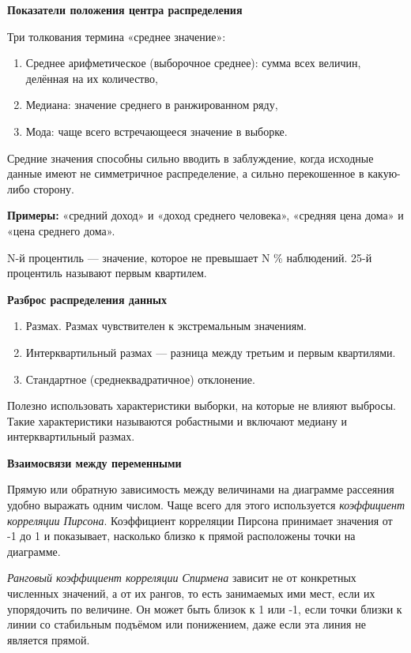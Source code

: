 \documentclass[11pt,a4paper]{article}
\providecommand{\tightlist}{%
      \setlength{\itemsep}{0pt}\setlength{\parskip}{0pt}}
\begin{document}
\textbf{Показатели положения центра
распределения}

Три толкования термина «среднее значение»:

\begin{enumerate}
\def\labelenumi{\arabic{enumi}.}
\tightlist
\item
  Среднее арифметическое (выборочное среднее): сумма всех величин,
  делённая на их количество,
\item
  Медиана: значение среднего в ранжированном ряду,
\item
  Мода: чаще всего встречающееся значение в выборке.
\end{enumerate}

Средние значения способны сильно вводить в заблуждение, когда исходные
данные имеют не симметричное распределение, а сильно перекошенное в
какую-либо сторону.

\textbf{Примеры:} «средний доход» и «доход среднего человека», «средняя
цена дома» и «цена среднего дома».

N-й процентиль --- значение, которое не превышает N \% наблюдений. 25-й
процентиль называют первым квартилем.


\textbf{Разброс распределения
данных}

\begin{enumerate}
\def\labelenumi{\arabic{enumi}.}
\tightlist
\item
  Размах. Размах чувствителен к экстремальным значениям.
\item
  Интерквартильный размах --- разница между третьим и первым квартилями.
\item
  Стандартное (среднеквадратичное) отклонение.
\end{enumerate}

Полезно использовать характеристики выборки, на которые не влияют
выбросы. Такие характеристики называются робастными и включают медиану и
интерквартильный размах.


\textbf{Взаимосвязи между
переменными}

Прямую или обратную зависимость между величинами на диаграмме рассеяния
удобно выражать одним числом. Чаще всего для этого используется
\emph{коэффициент корреляции Пирсона}. Коэффициент корреляции Пирсона
принимает значения от -1 до 1 и показывает, насколько близко к прямой
расположены точки на диаграмме.

\emph{Ранговый коэффициент корреляции Спирмена} зависит не от конкретных
численных значений, а от их рангов, то есть занимаемых ими мест, если их
упорядочить по величине. Он может быть близок к 1 или -1, если точки
близки к линии со стабильным подъёмом или понижением, даже если эта
линия не является прямой.
\end{document}
